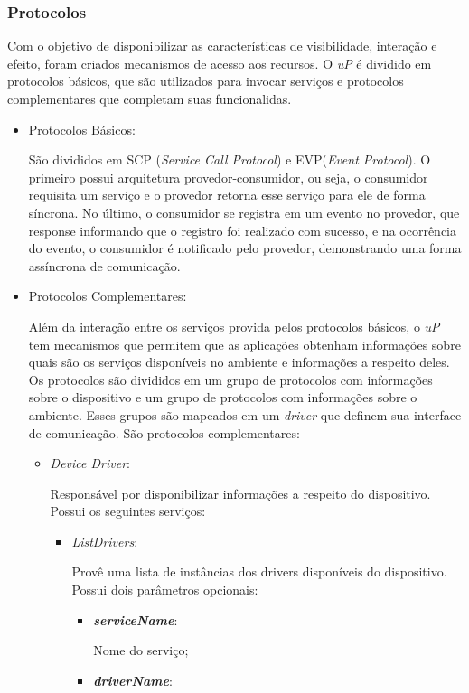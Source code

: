 \subsubsection{Protocolos}

Com o objetivo de disponibilizar as características de visibilidade, interação e efeito, foram criados mecanismos de acesso aos recursos. O \emph{uP} é dividido em protocolos básicos, que são utilizados para invocar serviços e protocolos complementares que completam suas  funcionalidas.

\begin{itemize}
	\item Protocolos Básicos: 

		São divididos em SCP (\emph{Service Call Protocol}) e EVP(\emph{Event Protocol}). O primeiro possui arquitetura provedor-consumidor, ou seja, o consumidor requisita um serviço e o provedor retorna esse serviço para ele de forma síncrona. No último, o consumidor se registra em um evento no provedor, que response informando que o registro foi realizado com sucesso, e na ocorrência do evento, o consumidor é notificado pelo provedor, demonstrando uma forma assíncrona de comunicação.
	\item Protocolos Complementares:

		Além da interação entre os serviços provida pelos protocolos básicos, o \emph{uP} tem mecanismos que permitem que as aplicações obtenham informações sobre quais são os serviços disponíveis no ambiente e informações a respeito deles. Os protocolos são divididos em um grupo de protocolos com informações sobre o dispositivo e um grupo de protocolos com informações sobre o ambiente. Esses grupos são mapeados em um \emph{driver} que definem sua interface de comunicação. São protocolos complementares:
	\begin{itemize}
		\item \emph{Device Driver}: 

			Responsável por disponibilizar informações a respeito do dispositivo. Possui os seguintes serviços:
			\begin{itemize}
				\item \emph{ListDrivers}: 

					Provê uma lista de instâncias dos drivers disponíveis do dispositivo. Possui dois parâmetros opcionais:
					\begin{itemize}
						\item \emph{\bf{serviceName}}: 

							Nome do serviço;
						\item \emph{\bf{driverName}}: 


\end{itemize}
\end{itemize}
\end{itemize}
\end{itemize}

